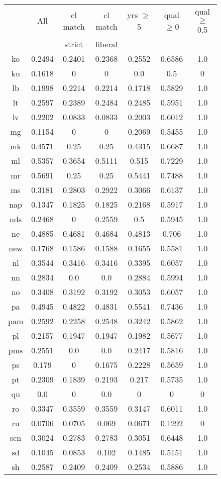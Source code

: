 \begin{figure}[h]
\centering
\begin{tabular}{ccccccc}
&All&cl match&cl match&yrs $\geq$ 5&qual$\geq$0&qual$\geq$0.5\\
&&strict&liberal&&&\\\hline\hline
ko&0.2494&0.2401&0.2368&0.2552&0.6586&1.0\\
ku&0.1618&0&0&0.0&0.5&0\\
lb&0.1998&0.2214&0.2214&0.1718&0.5829&1.0\\
lt&0.2597&0.2389&0.2484&0.2485&0.5951&1.0\\
lv&0.2202&0.0833&0.0833&0.2003&0.6012&1.0\\
mg&0.1154&0&0&0.2069&0.5455&1.0\\
mk&0.4571&0.25&0.25&0.4315&0.6687&1.0\\
ml&0.5357&0.3654&0.5111&0.515&0.7229&1.0\\
mr&0.5691&0.25&0.25&0.5441&0.7488&1.0\\
ms&0.3181&0.2803&0.2922&0.3066&0.6137&1.0\\
nap&0.1347&0.1825&0.1825&0.2168&0.5917&1.0\\
nds&0.2468&0&0.2559&0.5&0.5945&1.0\\
ne&0.4885&0.4681&0.4684&0.4813&0.706&1.0\\
new&0.1768&0.1586&0.1588&0.1655&0.5581&1.0\\
nl&0.3544&0.3416&0.3416&0.3395&0.6057&1.0\\
nn&0.2834&0.0&0.0&0.2884&0.5994&1.0\\
no&0.3408&0.3192&0.3192&0.3053&0.6057&1.0\\
pa&0.4945&0.4822&0.4831&0.5541&0.7436&1.0\\
pam&0.2592&0.2258&0.2548&0.3242&0.5862&1.0\\
pl&0.2157&0.1947&0.1947&0.1982&0.5677&1.0\\
pms&0.2551&0.0&0.0&0.2417&0.5816&1.0\\
ps&0.179&0&0.1675&0.2228&0.5659&1.0\\
pt&0.2309&0.1839&0.2193&0.217&0.5735&1.0\\
qu&0.0&0&0.0&0&0&0\\
ro&0.3347&0.3559&0.3559&0.3147&0.6011&1.0\\
ru&0.0706&0.0705&0.069&0.0671&0.1292&0\\
scn&0.3024&0.2783&0.2783&0.3051&0.6448&1.0\\
sd&0.1045&0.0853&0.102&0.1485&0.5151&1.0\\
sh&0.2587&0.2409&0.2409&0.2534&0.5886&1.0\\

\end{tabular}
\end{figure}
